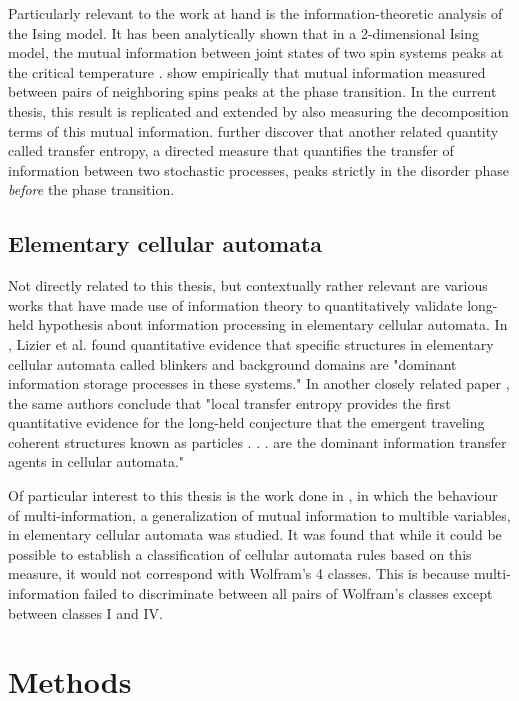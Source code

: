 \documentclass[12pt]{article}
\begin{document}
Particularly relevant to the work at hand is the information-theoretic analysis of the Ising model. It has been analytically shown that in a 2-dimensional Ising model, the mutual information between joint states of two spin systems peaks at the critical temperature \cite{mi-ising-analytic}. \cite{barnett-ising} show empirically that mutual information measured between pairs of neighboring spins peaks at the phase transition. In the current thesis, this result is replicated and extended by also measuring the decomposition terms of this mutual information. \cite{barnett-ising} further discover that another related quantity called transfer entropy, a directed measure that quantifies the transfer of information between two stochastic processes, peaks strictly in the disorder phase \textit{before} the phase transition. 

\subsection{Elementary cellular automata}

Not directly related to this thesis, but contextually rather relevant are various works that have made use of information theory to quantitatively validate long-held hypothesis about information processing in elementary cellular automata. In \cite{active-inf-storage}, Lizier et al. found quantitative evidence that specific structures in elementary cellular automata called blinkers and background domains are "dominant information storage processes in these systems." In another closely related paper \cite{local-transfer-entropy-ca}, the same authors conclude that "local transfer entropy provides the first quantitative evidence for the long-held conjecture that the emergent traveling coherent structures known as particles . . . are the dominant information transfer agents in cellular automata."

Of particular interest to this thesis is the work done in \cite{multi-inf-ca}, in which the behaviour of multi-information, a generalization of mutual information to multible variables, in elementary cellular automata was studied. It was found that while it could be possible to establish a classification of cellular automata rules based on this measure, it would not correspond with Wolfram's 4 classes. This is because multi-information failed to discriminate between all pairs of Wolfram's classes except between classes I and IV.

\newpage
\section{Methods}
\end{document}
